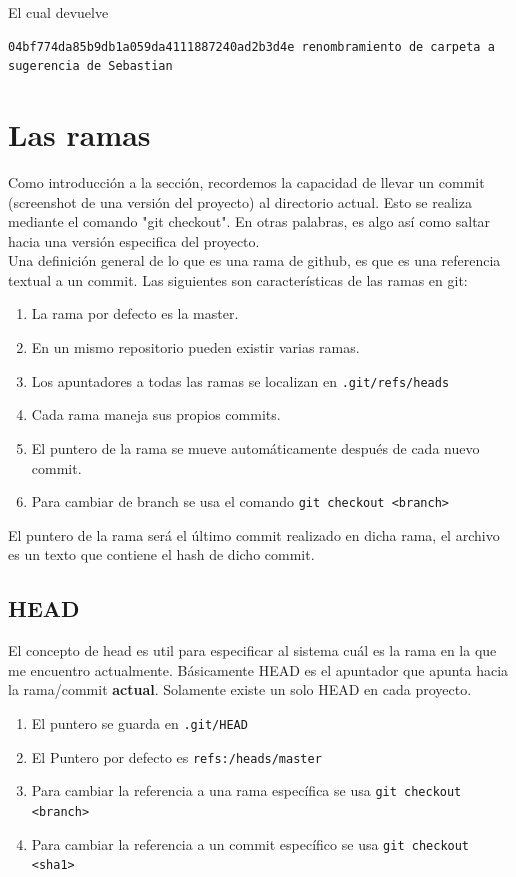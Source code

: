 El cual devuelve

\begin{verbatim}
04bf774da85b9db1a059da4111887240ad2b3d4e renombramiento de carpeta a sugerencia de Sebastian
\end{verbatim}

\section{Las ramas}

Como introducción a la sección, recordemos la capacidad de llevar un commit (screenshot de una versión del proyecto) al directorio actual. Esto se realiza mediante el comando "git checkout". En otras palabras, es algo así como saltar hacia una versión especifica del proyecto. \\

Una definición general de lo que es una rama de github, es que es una referencia textual a un commit. Las siguientes son características de las ramas en git:

\begin{enumerate}
    \item La rama por defecto es la master.
    \item En un mismo repositorio pueden existir varias ramas.
    \item Los apuntadores a todas las ramas se localizan en \texttt{.git/refs/heads}
    \item Cada rama maneja sus propios commits.
    \item El puntero de la rama se mueve automáticamente después de cada nuevo commit.
    \item Para cambiar de branch se usa el comando \texttt{git checkout <branch>}
\end{enumerate}

El puntero de la rama será el último commit realizado en dicha rama, el archivo es un texto que contiene el hash de dicho commit.

\subsection{HEAD}

El concepto de head es util para especificar al sistema cuál es la rama en la que me encuentro actualmente. Básicamente HEAD es el apuntador que apunta hacia la rama/commit \textbf{actual}. Solamente existe un solo HEAD en cada proyecto.

\begin{enumerate}
    \item El puntero se guarda en \texttt{.git/HEAD}
    \item El Puntero por defecto es \texttt{refs:/heads/master}
    \item Para cambiar la referencia a una rama específica se usa \texttt{git checkout <branch>}
    \item Para cambiar la referencia a un commit específico se usa \texttt{git checkout <sha1>}
\end{enumerate}

